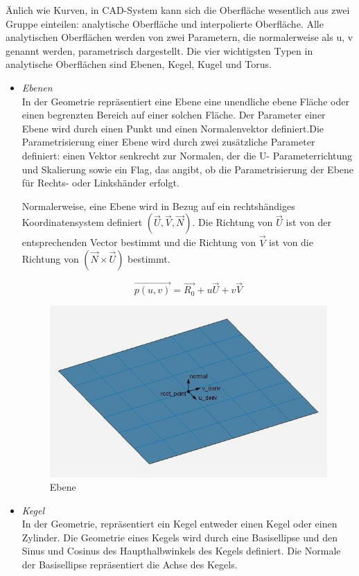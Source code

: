 \documentclass[14pt,a4paper,titlepage]{article}
\begin{document}
\begin{itemize}
				Änlich wie Kurven, in CAD-System kann sich die Oberfläche wesentlich aus zwei Gruppe einteilen: analytische Oberfläche und interpolierte Oberfläche.
				Alle analytischen Oberflächen werden von zwei Parametern, die normalerweise als u, v genannt werden, parametrisch dargestellt. Die vier wichtigsten Typen in analytische Oberflächen sind Ebenen, Kegel, Kugel und Torus.
			
			\begin{itemize}
				\item \emph{Ebenen}
					\\
					In der Geometrie repräsentiert eine Ebene eine unendliche ebene Fläche oder einen begrenzten Bereich auf einer solchen Fläche.
					Der Parameter einer Ebene wird durch einen Punkt und einen Normalenvektor definiert.Die Parametrisierung einer Ebene wird durch zwei zusätzliche Parameter definiert: einen Vektor senkrecht zur Normalen, der die U- Parameterrichtung und Skalierung sowie ein Flag, das angibt, ob die Parametrisierung der Ebene für Rechts- oder Linkshänder erfolgt.
					
					\bigbreak
					Normalerweise, eine Ebene wird in Bezug auf ein rechtshändiges Koordinatensystem definiert \( (\vec{U},\vec{V},\vec{N}) \).
					Die Richtung von \( \vec{U}\) ist von der entsprechenden Vector bestimmt und die Richtung von \( \vec{V}\) ist von die Richtung von \( (\vec{N}\times\vec{U}) \) bestimmt.
					
					\begin{equation*}
					\vec{p(u,v)} = \vec{R_0} + u\vec{U} + v\vec{V}
					\end{equation*}
					\begin{figure}[h!]
						\centering
						\includegraphics[width=0.5\linewidth]{plane.png}
						\caption{Ebene}
						\label{fig5}
					\end{figure}
				
				\item \emph{Kegel}
					\\
					In der Geometrie, repräsentiert ein Kegel entweder einen Kegel oder einen Zylinder. Die Geometrie eines Kegels wird durch eine Basisellipse und den Sinus und Cosinus des Haupthalbwinkels des Kegels definiert. Die Normale der Basisellipse repräsentiert die Achse des Kegels. 


\end{itemize}
\end{itemize}
\end{document}
